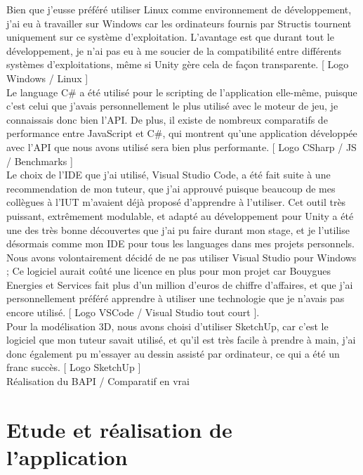 \documentclass[a4paper]{article}
\begin{document}
    Bien que j'eusse préféré utiliser Linux comme environnement de développement, j'ai eu à travailler sur Windows car les ordinateurs fournis par Structis tournent uniquement sur ce système d'exploitation. L'avantage est que durant tout le développement, je n'ai pas eu à me soucier de la compatibilité entre différents systèmes d'exploitations, même si Unity gère cela de façon transparente. [ Logo Windows / Linux ] \\
    
    Le language C\# a été utilisé pour le scripting de l'application elle-même, puisque c'est celui que j'avais personnellement le plus utilisé avec le moteur de jeu, je connaissais donc bien l'API. De plus, il existe de nombreux comparatifs de performance entre JavaScript et C\#, qui montrent qu'une application développée avec l'API que nous avons utilisé sera bien plus performante. [ Logo CSharp / JS / Benchmarks ] \\

    Le choix de l'IDE que j'ai utilisé, Visual Studio Code, a été fait suite à une recommendation de mon tuteur, que j'ai approuvé puisque beaucoup de mes collègues à l'IUT m'avaient déjà proposé d'apprendre à l'utiliser. Cet outil très puissant, extrêmement modulable, et adapté au développement pour Unity a été une des très bonne découvertes que j'ai pu faire durant mon stage, et je l'utilise désormais comme mon IDE pour tous les languages dans mes projets personnels. Nous avons volontairement décidé de ne pas utiliser Visual Studio pour Windows ; Ce logiciel aurait coûté une licence en plus pour mon projet car Bouygues Energies et Services fait plus d'un million d'euros de chiffre d'affaires, et que j'ai personnellement préféré apprendre à utiliser une technologie que je n'avais pas encore utilisé. [ Logo VSCode / Visual Studio tout court ].\\

    Pour la modélisation 3D, nous avons choisi d'utiliser SketchUp, car c'est le logiciel que mon tuteur savait utilisé, et qu'il est très facile à prendre à main, j'ai donc également pu m'essayer au dessin assisté par ordinateur, ce qui a été un franc succès. [ Logo SketchUp ] \\

    Réalisation du BAPI / Comparatif en vrai \\

    \section{Etude et réalisation de l'application}
\end{document}
